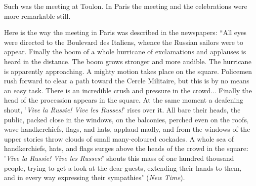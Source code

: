 \documentclass{book}
\begin{document}
Such was the meeting at Toulon. In Paris the meeting and the celebrations were more remarkable still.

Here is the way the meeting in Paris was described in the newspapers: “All eyes were directed to the Boulevard des Italiens, whence the Russian sailors were to appear. Finally the boom of a whole hurricane of exclamations and applauses is heard in the distance. The boom grows stronger and more audible. The hurricane is apparently approaching. A mighty motion takes place on the square. Policemen rush forward to clear a path toward the Cercle Militaire, but this is by no means an easy task. There is an incredible crush and pressure in the crowd... Finally the head of the procession appears in the square. At the same moment a deafening shout, '\emph{Vive la Russie! Vive les Russes!}' rises over it. All bare their heads, the public, packed close in the windows, on the balconies, perched even on the roofs, wave handkerchiefs, flags, and hats, applaud madly, and from the windows of the upper stories throw clouds of small many-coloured cockades. A whole sea of handkerchiefs, hats, and flags surges above the heads of the crowd in the square: '\emph{Vive la Russie! Vive les Russes!}' shouts this mass of one hundred thousand people, trying to get a look at the dear guests, extending their hands to them, and in every way expressing their sympathies" (\emph{New Time}).
\end{document}
